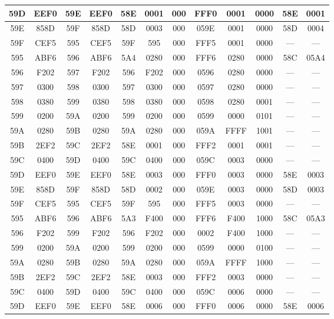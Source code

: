 {\begin{center}
\begin{tabular}{|c|c|c|c|c|c|c|c|c|c|c|c|}
		\hline
		59D & EEF0 & 59E & EEF0 & 58E & 0001 & 000 & FFF0 & 0001 & 0000 & 58E & 0001\\
		\hline
		59E & 858D & 59F & 858D & 58D & 0003 & 000 & 059E & 0001 & 0000 & 58D & 0004\\
		\hline
		59F & CEF5 & 595 & CEF5 & 59F & 595 & 000 & FFF5 & 0001 & 0000 & --- & ---\\
		\hline
		595 & ABF6 & 596 & ABF6 & 5A4 & 0280 & 000 & FFF6 & 0280 & 0000 & 58C & 05A4\\
		\hline
		596 & F202 & 597 & F202 & 596 & F202 & 000 & 0596 & 0280 & 0000 & --- & ---\\
		\hline
		597 & 0300 & 598 & 0300 & 597 & 0300 & 000 & 0597 & 0280 & 0000 & --- & ---\\
		\hline
		598 & 0380 & 599 & 0380 & 598 & 0380 & 000 & 0598 & 0280 & 0001 & --- & ---\\
		\hline
		599 & 0200 & 59A & 0200 & 599 & 0200 & 000 & 0599 & 0000 & 0101 & --- & ---\\
		\hline
		59A & 0280 & 59B & 0280 & 59A & 0280 & 000 & 059A & FFFF & 1001 & --- & ---\\
		\hline
		59B & 2EF2 & 59C & 2EF2 & 58E & 0001 & 000 & FFF2 & 0001 & 0001 & --- & ---\\
		\hline
		59C & 0400 & 59D & 0400 & 59C & 0400 & 000 & 059C & 0003 & 0000 & --- & ---\\
		\hline
		59D & EEF0 & 59E & EEF0 & 58E & 0003 & 000 & FFF0 & 0003 & 0000 & 58E & 0003\\
		\hline
		59E & 858D & 59F & 858D & 58D & 0002 & 000 & 059E & 0003 & 0000 & 58D & 0003\\
		\hline
		59F & CEF5 & 595 & CEF5 & 59F & 595 & 000 & FFF5 & 0003 & 0000 & --- & ---\\
		\hline
		595 & ABF6 & 596 & ABF6 & 5A3 & F400 & 000 & FFF6 & F400 & 1000 & 58C & 05A3\\
		\hline
		596 & F202 & 599 & F202 & 596 & F202 & 000 & 0002 & F400 & 1000 & --- & ---\\
		\hline
		599 & 0200 & 59A & 0200 & 599 & 0200 & 000 & 0599 & 0000 & 0100 & --- & ---\\
		\hline
		59A & 0280 & 59B & 0280 & 59A & 0280 & 000 & 059A & FFFF & 1000 & --- & ---\\
		\hline
		59B & 2EF2 & 59C & 2EF2 & 58E & 0003  & 000 & FFF2 & 0003 & 0000 & --- & ---\\
		\hline
		59C & 0400 & 59D & 0400 & 59C & 0400 & 000 & 059C & 0006 & 0000 & --- & ---\\
		\hline
		59D & EEF0 & 59E & EEF0 & 58E & 0006 & 000 & FFF0 & 0006 & 0000 & 58E & 0006\\

\end{tabular}
\end{center}}
